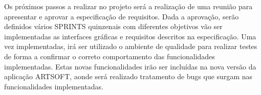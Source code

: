 \documentclass[sigplan]{acmart}
\begin{document}

Os próximos passos a realizar no projeto será a realização de uma reunião para apresentar e aprovar a especificação de requisitos. Dada a aprovação, serão definidos vários SPRINTS quinzenais com diferentes objetivos vão ser implementadas as interfaces gráficas e requisitos descritos na especificação. Uma vez implementadas, irá ser utilizado o ambiente de qualidade para realizar testes de forma a confirmar o correto comportamento das funcionalidades implementadas. Estas novas funcionalidades irão ser incluídas na nova versão da aplicação ARTSOFT, aonde será realizado tratamento de bugs que surgam nas funcionalidades implementadas.



\end{document}
